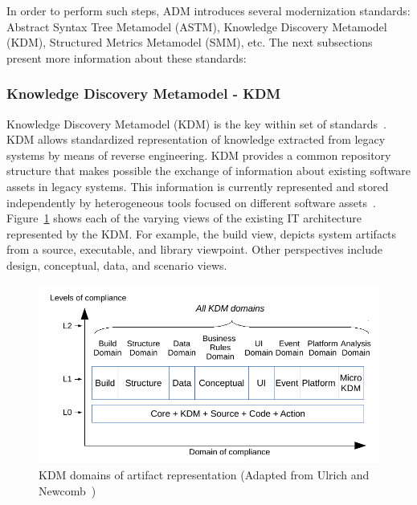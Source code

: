 \documentclass[a4paper,twoside]{article}
\begin{document}
In order to perform such steps, ADM introduces several modernization standards: Abstract Syntax Tree Metamodel (ASTM), Knowledge Discovery Metamodel (KDM), Structured Metrics Metamodel (SMM), etc. The next subsections present more information about these standards:



\subsubsection{Knowledge Discovery Metamodel - KDM}\label{subsec:KDM}

Knowledge Discovery Metamodel (KDM) is the key within set of standards~\cite{1686216}. KDM allows standardized representation of knowledge extracted from legacy systems by means of reverse engineering. KDM provides a common repository structure that makes possible the exchange of information about existing software assets in legacy systems. This information is currently represented and stored independently by heterogeneous tools focused on different software assets~\cite[p.~32]{Ulrich:2010:IST:1841736}. Figure~\ref{kdm} shows each of the varying views of the existing IT architecture represented by the KDM. For example, the build view, depicts system artifacts from a source, executable, and library viewpoint. Other perspectives include design, conceptual, data, and scenario views.

\begin{figure}[!ht]
\centering
  \includegraphics[scale=0.58]{figuras/kdm}
\caption{KDM domains of artifact representation (Adapted from Ulrich and Newcomb~\cite{Ulrich:2010:IST:1841736})}
\label{kdm}
\end{figure}
\end{document}

